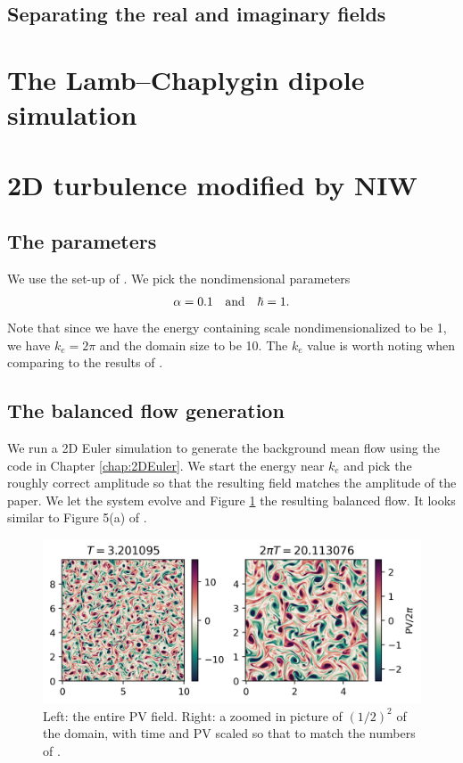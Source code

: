 \subsection{Separating the real and imaginary fields}

\section{The Lamb–Chaplygin dipole simulation}

\section{2D turbulence modified by NIW}
\subsection{The parameters}
We use the set-up of \cite[Tabel 4 \& \S 4.2]{RochaEtAl_18}. We pick the nondimensional parameters
\begin{align}
    \alpha = 0.1 \quad \mbox{and} \quad \hbar = 1.
\end{align}
Note that since we have the energy containing scale nondimensionalized to be 1, we have $k_e = 2\pi$ and the domain size to be 10. The $k_e$ value is worth noting when comparing to the results of \cite{RochaEtAl_18}.

\subsection{The balanced flow generation}
We run a 2D Euler simulation to generate the background mean flow using the code in Chapter \ref{chap:2DEuler}. We start the energy near $k_e$ and pick the roughly correct amplitude so that the resulting field matches the amplitude of the \cite{RochaEtAl_18} paper. We let the system evolve and Figure \ref{fig:PVbalanced} the resulting balanced flow. It looks similar to Figure 5(a) of \cite{RochaEtAl_18}. 
\begin{figure}[H]
    \centering
    \includegraphics{PVbalanced}
    \caption{Left: the entire PV field. Right: a zoomed in picture of $(1/2)^2$ of the domain, with time and PV scaled so that to match the numbers of \cite{RochaEtAl_18}.}
    \label{fig:PVbalanced}
\end{figure}

